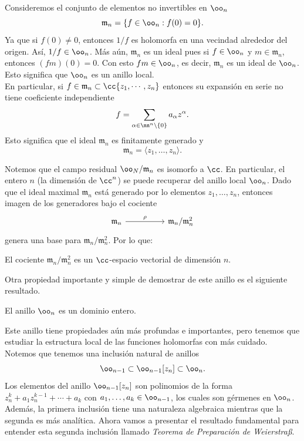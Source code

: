 \begin{remark}
	Consideremos el conjunto de elementos no invertibles en $\oo_{n}$
	\begin{equation*}
		\mathfrak{m}_n=\{f\in\oo_{n}:f(0)=0\}.
	\end{equation*}
	Ya que si $f(0)\neq 0$, entonces $1/f$ es holomorfa en una vecindad alrededor del origen. Así, $1/f\in\oo_{n}$. Más aún, $\mathfrak{m}_n$ es un ideal pues si $f\in\oo_{n}$ y $m\in\mathfrak{m}_n$, entonces $(fm)(0)=0$. Con esto $fm\in\oo_{n}$, es decir, $\mathfrak{m}_n$ es un ideal de $\oo_{n}$. Esto significa que $\oo_{n}$ es un anillo local.\\
	En particular, si $f\in\mathfrak{m}_n\subset \cc\{z_1,\cdots,z_n\}$ entonces su expansión en serie no tiene coeficiente independiente
	\begin{equation*}
		f=\sum_{\alpha\in\nn^n\setminus\{0\}}a_\alpha z^{\alpha}.
	\end{equation*}
	Esto significa que el ideal $\mathfrak{m}_n$ es finitamente generado y
	\begin{equation*}
		\mathfrak{m}_n=\langle z_1,\dots,z_n \rangle.
	\end{equation*}
\end{remark}
Notemos que el campo residual $\oo_{N}/\mathfrak{m}_n$ es isomorfo a $\cc$. En particular, el entero $n$ (la dimensión de $\cc^n$) se puede recuperar del anillo local $\oo_{n}$. Dado que el ideal maximal $\mathfrak{m}_n$ está generado por lo elementos $z_1,\dots,z_n$, entonces imagen de los generadores bajo el cociente
\[\begin{tikzcd}
	{\mathfrak{m}_n} && {\mathfrak{m}_n/\mathfrak{m}_n^2}
	\arrow["\rho", from=1-1, to=1-3]
\end{tikzcd}\]
genera una base para $\mathfrak{m}_n/\mathfrak{m}_n^2$. Por lo que:
\begin{corollary}
	El cociente $\mathfrak{m}_n/\mathfrak{m}_n^2$ es un $\cc$-espacio vectorial de dimensión $n$.
\end{corollary}

Otra propiedad importante y simple de demostrar de este anillo es el siguiente resultado.

\begin{propo}
	El anillo $\oo_{n}$ es un dominio entero.
\end{propo}

Este anillo tiene propiedades aún más profundas e importantes, pero tenemos que estudiar la estructura local de las funciones holomorfas con más cuidado. Notemos que tenemos una inclusión natural de anillos 
\begin{equation*}
	\oo_{n-1}\subset \oo_{n-1}[z_n]\subset \oo_n.
\end{equation*}
Los elementos del anillo $\oo_{n-1}[z_n]$ son polinomios de la forma $z_n^k+a_1z_n^{k-1}+\cdots+a_k$ con $a_1,\dots,a_k\in \oo_{n-1}$, los cuales son gérmenes en $\oo_n$. Además, la primera inclusión tiene una naturaleza algebraica mientras que la segunda es más analítica. Ahora vamos a presentar el resultado fundamental para entender esta segunda inclusión llamado \textit{Teorema de Preparación de Weierstraß}.

